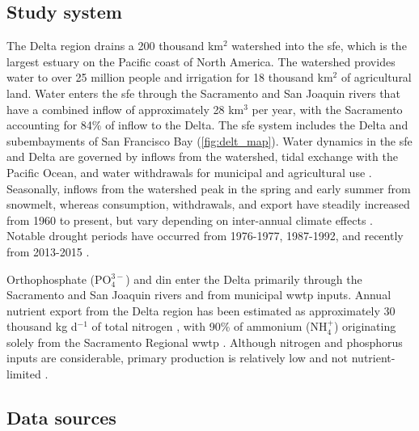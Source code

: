 \documentclass[letterpaper,12pt,oneside]{article}\usepackage[]{graphicx}\usepackage[]{color}
\begin{document}
\subsection{Study system}

The Delta region drains a 200 thousand km$^2$ watershed into the \ac{sfe}, which is the largest estuary on the Pacific coast of North America.  The watershed provides water to over 25 million people and irrigation for 18 thousand km$^2$ of agricultural land.  Water enters the \ac{sfe} through the Sacramento and San Joaquin rivers that have a combined inflow of approximately 28 km$^3$ per year, with the Sacramento accounting for 84\% of inflow to the Delta.  The \ac{sfe} system includes the Delta and subembayments of San Francisco Bay (\cref{fig:delt_map}).  Water dynamics in the \ac{sfe} and Delta are governed by inflows from the watershed, tidal exchange with the Pacific Ocean, and water withdrawals for municipal and agricultural use \citep{Jassby00}.  Seasonally, inflows from the watershed peak in the spring and early summer from snowmelt, whereas consumption, withdrawals, and export have steadily increased from 1960 to present, but vary depending on inter-annual climate effects \citep{Cloern12b}. Notable drought periods have occurred from 1976-1977, 1987-1992, and recently from 2013-2015 \citep{Cloern15}.

Orthophosphate (PO$_4^{3-}$) and \ac{din} enter the Delta primarily through the Sacramento and San Joaquin rivers and from municipal \ac{wwtp} inputs.  Annual nutrient export from the Delta region has been estimated as approximately 30 thousand kg d$^{-1}$ of total nitrogen \citep[varying with flow,][]{Novick15}, with 90\% of ammonium (NH$_4^{+}$) originating solely from the Sacramento Regional \ac{wwtp} \citep{Jassby08}.  Although nitrogen and phosphorus inputs are considerable, primary production is relatively low and not nutrient-limited \citep{Jassby02,Kimmerer12}.

\subsection{Data sources}

\end{document}
